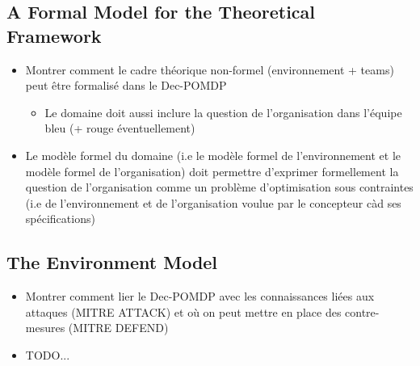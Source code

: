 \subsection{A Formal Model for the Theoretical Framework}
\begin{itemize}

    \item Montrer comment le cadre théorique non-formel (environnement + teams) peut être formalisé dans le Dec-POMDP
          \begin{itemize}
              \item Le domaine doit aussi inclure la question de l'organisation dans l'équipe bleu (+ rouge éventuellement)
          \end{itemize}
    \item Le modèle formel du domaine (i.e le modèle formel de l'environnement et le modèle formel de l'organisation) doit permettre d'exprimer formellement la question de l'organisation comme un problème d'optimisation sous contraintes (i.e de l'environnement et de l'organisation voulue par le concepteur càd ses spécifications)
\end{itemize}

\subsection{The Environment Model}
\begin{itemize}

    \item Montrer comment lier le Dec-POMDP avec les connaissances liées aux attaques (MITRE ATTACK) et où on peut mettre en place des contre-mesures (MITRE DEFEND)
    \item TODO...
\end{itemize}

